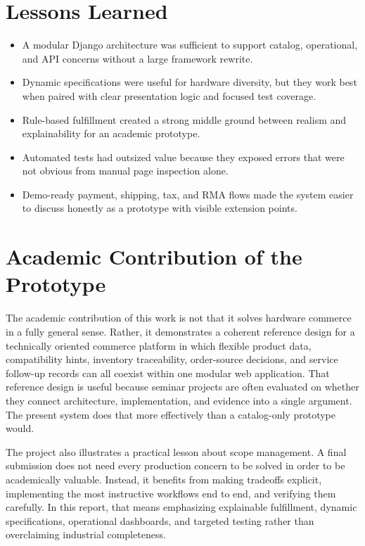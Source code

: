 \documentclass[12pt,letterpaper,oneside,openany]{book}
\begin{document}
\section{Lessons Learned}

\begin{itemize}[leftmargin=0.4in]
    \item A modular Django architecture was sufficient to support catalog, operational, and API concerns without a large framework rewrite.
    \item Dynamic specifications were useful for hardware diversity, but they work best when paired with clear presentation logic and focused test coverage.
    \item Rule-based fulfillment created a strong middle ground between realism and explainability for an academic prototype.
    \item Automated tests had outsized value because they exposed errors that were not obvious from manual page inspection alone.
    \item Demo-ready payment, shipping, tax, and RMA flows made the system easier to discuss honestly as a prototype with visible extension points.
\end{itemize}

\section{Academic Contribution of the Prototype}

\begin{justifying}
The academic contribution of this work is not that it solves hardware commerce
in a fully general sense. Rather, it demonstrates a coherent reference design
for a technically oriented commerce platform in which flexible product data,
compatibility hints, inventory traceability, order-source decisions, and
service follow-up records can all coexist within one modular web application.
That reference design is useful because seminar projects are often evaluated on
whether they connect architecture, implementation, and evidence into a single
argument. The present system does that more effectively than a catalog-only
prototype would.
\end{justifying}

\begin{justifying}
The project also illustrates a practical lesson about scope management. A final
submission does not need every production concern to be solved in order to be
academically valuable. Instead, it benefits from making tradeoffs explicit,
implementing the most instructive workflows end to end, and verifying them
carefully. In this report, that means emphasizing explainable fulfillment,
dynamic specifications, operational dashboards, and targeted testing rather
than overclaiming industrial completeness.
\end{justifying}
\end{document}
